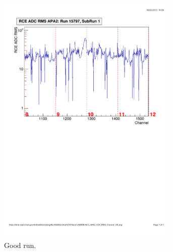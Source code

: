 \begin{figure}
  \centering
  \begin{subfigure}{0.45\linewidth}
    \centering
    \includegraphics[width=0.95\textwidth]{DataRMSGood.pdf}
    \caption{Good run.}
    \label{fig:DataRMSGoodRun}
  \end{subfigure}
  \hfill
  \begin{subfigure}{0.45\linewidth}
    \centering

\end{subfigure}
\end{figure}

